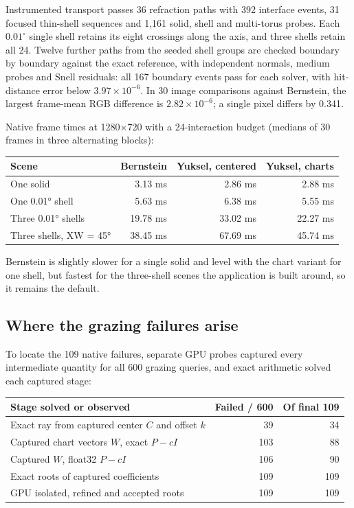 \documentclass{jcgt}
\begin{document}
Instrumented transport passes 36 refraction paths with 392 interface
events, 31 focused thin-shell sequences and 1,161 solid, shell and
multi-torus probes. Each \(0.01^\circ\) single shell retains its eight
crossings along the axis, and three shells retain all 24. Twelve further
paths from the seeded shell groups are checked boundary by boundary
against the exact reference, with independent normals, medium probes and
Snell residuals: all 167 boundary events pass for each solver, with
hit-distance error below \(3.97\times10^{-6}\). In 30 image comparisons
against Bernstein, the largest frame-mean RGB difference is
\(2.82\times10^{-6}\); a single pixel differs by 0.341.

Native frame times at 1280×720 with a 24-interaction budget (medians of
30 frames in three alternating blocks):

{
\begin{longtable}[]{@{}lrrr@{}}
\toprule\noalign{}
Scene & Bernstein & Yuksel, centered & Yuksel, charts \\
\midrule\noalign{}
\endhead
\bottomrule\noalign{}
\endlastfoot
One solid & 3.13 ms & 2.86 ms & 2.88 ms \\
One 0.01° shell & 5.63 ms & 6.38 ms & 5.55 ms \\
Three 0.01° shells & 19.78 ms & 33.02 ms & 22.27 ms \\
Three shells, XW = 45° & 38.45 ms & 67.69 ms & 45.74 ms \\
\end{longtable}
}

Bernstein is slightly slower for a single solid and level with the chart
variant for one shell, but fastest for the three-shell scenes the
application is built around, so it remains the default.

\subsection{Where the grazing failures
arise}\label{where-the-grazing-failures-arise}

To locate the 109 native failures, separate GPU probes captured every
intermediate quantity for all 600 grazing queries, and exact arithmetic
solved each captured stage:

{
\begin{longtable}[]{@{}lrr@{}}
\toprule\noalign{}
Stage solved or observed & Failed / 600 & Of final 109 \\
\midrule\noalign{}
\endhead
\bottomrule\noalign{}
\endlastfoot
Exact ray from captured center \(C\) and offset \(k\) & 39 & 34 \\
Captured chart vectors \(W\), exact \(P-cI\) & 103 & 88 \\
Captured \(W\), float32 \(P-cI\) & 106 & 90 \\
Exact roots of captured coefficients & 109 & 109 \\
GPU isolated, refined and accepted roots & 109 & 109 \\
\end{longtable}
}
\end{document}
